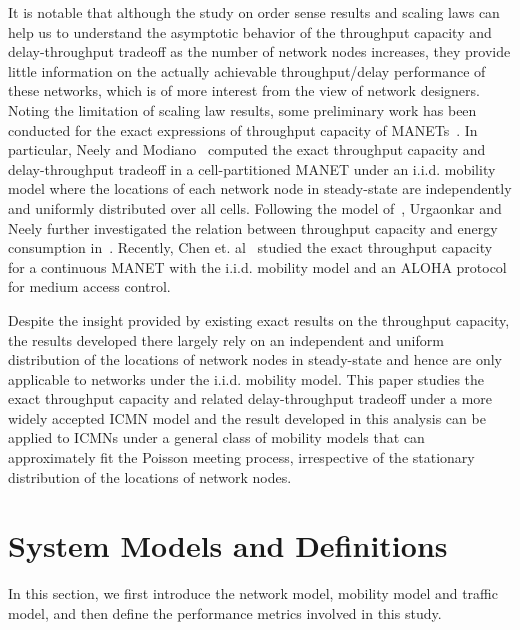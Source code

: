 \documentclass[twocolumn, 10pt]{svjour3}         \smartqed  \usepackage{graphicx}
\begin{document}
It is notable that although the study on order sense results and scaling laws can help us to understand the asymptotic behavior of the throughput capacity and delay-throughput tradeoff as the number of network nodes increases, they provide little information on the actually achievable throughput/delay performance of these networks, which is of more interest from the view of network designers.
Noting the limitation of scaling law results, some preliminary work has been conducted for the exact expressions of throughput capacity of MANETs~\cite{Neely2005,Urgaonkar2011,JuntaoGao2013,Chen2013Proc.IEEEICCC}.
In particular, Neely and Modiano~\cite{Neely2005} computed the exact throughput capacity and delay-throughput tradeoff in a cell-partitioned MANET under an i.i.d. mobility model where the  locations of each network node in steady-state are independently and uniformly distributed over all cells.
Following the model of~\cite{Neely2005}, Urgaonkar and Neely further investigated the relation between throughput capacity and energy consumption in~\cite{Urgaonkar2011}.
Recently, Chen et. al~\cite{Chen2013Proc.IEEEICCC} studied the exact throughput capacity for a continuous MANET with the i.i.d. mobility model and an ALOHA  protocol for medium access control.


Despite the insight provided by existing exact results on the throughput capacity, the results developed there largely rely on an independent and uniform distribution of the locations of network nodes  in steady-state and hence are only applicable to networks under the i.i.d. mobility model.
This paper studies the exact throughput capacity and related delay-throughput tradeoff under a more widely accepted ICMN model and the result developed in this analysis can be applied to ICMNs under a general class of mobility models that can approximately fit the Poisson meeting process, irrespective of the stationary distribution of the locations of network nodes.




















\section{System Models and Definitions}\label{sec:model}
In this section, we first introduce the network model, mobility model and traffic model, and then define the performance metrics involved in this study.
\end{document}
